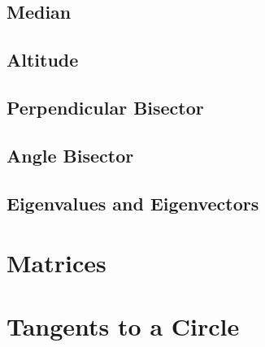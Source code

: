 \documentclass[journal]{IEEEtran}
\begin{document}
\subsection{Median}

\subsection{Altitude}

\subsection{Perpendicular Bisector}

\subsection{Angle Bisector}

\subsection{Eigenvalues and Eigenvectors}

\section{Matrices}


%

\appendices
\section{Tangents to a Circle}

\end{document}
